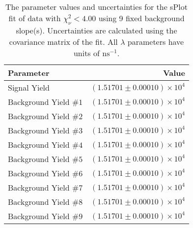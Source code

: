 
\begin{table}
    \begin{center}
        \begin{tabular}{lr}\toprule
            Parameter & Value \\\midrule
            Signal Yield & $(1.51701 \pm 0.00010) \times 10^{4}$ \\
            Background Yield $\#1$ & $(1.51701 \pm 0.00010) \times 10^{4}$ \\
            Background Yield $\#2$ & $(1.51701 \pm 0.00010) \times 10^{4}$ \\
            Background Yield $\#3$ & $(1.51701 \pm 0.00010) \times 10^{4}$ \\
            Background Yield $\#4$ & $(1.51701 \pm 0.00010) \times 10^{4}$ \\
            Background Yield $\#5$ & $(1.51701 \pm 0.00010) \times 10^{4}$ \\
            Background Yield $\#6$ & $(1.51701 \pm 0.00010) \times 10^{4}$ \\
            Background Yield $\#7$ & $(1.51701 \pm 0.00010) \times 10^{4}$ \\
            Background Yield $\#8$ & $(1.51701 \pm 0.00010) \times 10^{4}$ \\
            Background Yield $\#9$ & $(1.51701 \pm 0.00010) \times 10^{4}$ \\\bottomrule
        \end{tabular}
        \caption{The parameter values and uncertainties for the sPlot fit of data with $\chi^2_\nu < 4.00$ using 9 fixed background slope(s). Uncertainties are calculated using the covariance matrix of the fit. All $\lambda$ parameters have units of $\si{\nano\second}^{-1}$.}
    \end{center}
\end{table}
